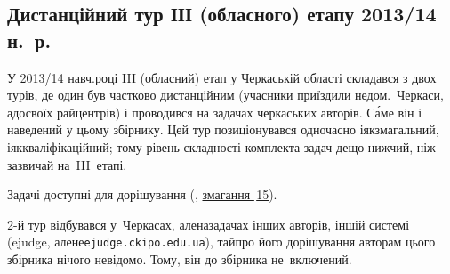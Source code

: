 \renewenvironment{problemAllDefault}[1]{\vspace{10mm}\par\begin{problem}{#1}{Клавіатура (stdin)}{Екран (stdout)}{1 сек}{64 мегабайти}}{\end{problem}}


\subsection{Дистанційний тур ІІІ (обласного) етапу 2013/14 н.~р.}

\hspace*{\parindent}У 2013/14 навч.\nolinebreak[3] році III (обласний) етап у Черкаській області складався з двох турів, де один був частково дистанційним (учасники приїздили не\nolinebreak[3] до\nolinebreak[3] м.~Черкаси, а\nolinebreak[3] до\nolinebreak[3] своїх райцентрів) і проводився на задачах черкаських авторів. С\'{а}ме він і наведений у цьому збірнику. Цей тур позиціонувався одночасно і\nolinebreak[2] як\nolinebreak[2] змагальний, і\nolinebreak[2] як\nolinebreak[2] кваліфікаційний; тому рівень складності комплекта задач дещо нижчий, ніж зазвичай на~III~етапі.

Задачі доступні для дорішування (\EjudgeCkipoName, \href{https://ejudge.ckipo.edu.ua/cgi-bin/new-register?contest_id=15}{змагання \textnumero$\,$15}). 

2-й тур відбувався у~Черкасах, але\nolinebreak[2] на\nolinebreak[2] задачах інших авторів, іншій системі (ejudge, але\nolinebreak[2] не\nolinebreak[2] \verb"ejudge.ckipo.edu.ua"), та\nolinebreak[3] й\nolinebreak[3] про його дорішування авторам цього збірника нічого не\nolinebreak[3] відомо. Тому, він до збірника не~включений.


\vspace{-0.5\baselineskip minus 1cm}
	

	

	

	


